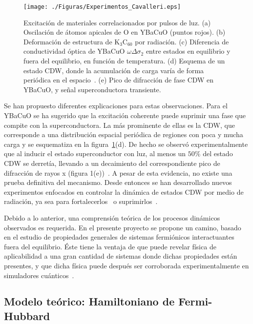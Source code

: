 \documentclass[a4paper,10pt]{article}
\begin{document}
\begin{figure}
\begin{center}
\texttt{[image: ./Figuras/Experimentos\_Cavalleri.eps]}
\caption{\label{exper_cavalleri} Excitaci\'on de materiales correlacionados por pulsos de luz. (a) Oscilaci\'on de \'atomos apicales de O en YBaCuO (puntos rojos). (b) Deformaci\'on de estructura de K$_3$C$_{60}$ por radiaci\'on. (c) Diferencia de conductividad \'optica de YBaCuO $\omega\Delta\sigma_2$ entre estados en equilibrio y fuera del equilibrio, en funci\'on de temperatura. (d) Esquema de un estado CDW, donde la acumulaci\'on de carga var\'ia de forma peri\'odica en el espacio~\cite{singer2016prl}. (e) Pico de difracci\'on de fase CDW en YBaCuO, y se\~nal superconductora transiente.}
\end{center}
\end{figure}

Se han propuesto diferentes explicaciones para estas observaciones. Para el YBaCuO se ha sugerido que la excitaci\'on coherente puede suprimir una fase que compite con la superconductora. La m\'as prominente de ellas es la CDW, que corresponde a una distribuci\'on espacial peri\'odica de regiones con poca y mucha carga y se esquematiza en la figura~\ref{exper_cavalleri}(d). De hecho se observ\'o experimentalmente que al inducir el estado superconductor con luz, al menos un $50\%$ del estado CDW se derret\'ia, llevando a un decaimiento del correspondiente pico de difracci\'on de rayos x (figura 1(e))~\cite{forst2014prb}. A pesar de esta evidencia, no existe una prueba definitiva del mecanismo. Desde entonces se han desarrollado nuevos experimentos enfocados en controlar la din\'amica de estados CDW por medio de radiaci\'on, ya sea para fortalecerlos~\cite{singer2016prl} o suprimirlos~\cite{mankowsky2017prl}. 

Debido a lo anterior, una comprensi\'on te\'orica de los procesos din\'amicos observados es requerida. En el presente proyecto se propone un camino, basado en el estudio de propiedades generales de sistemas fermi\'onicos interactuantes fuera del equilibrio. \'Este tiene la ventaja de que puede revelar f\'isica de aplicabilidad a una gran cantidad de sistemas donde dichas propiedades est\'an presentes, y que dicha f\'isica puede despu\'es ser corroborada experimentalmente en simuladores cu\'anticos~\cite{georgescu2014rmp}.

\subsection{Modelo te\'orico: Hamiltoniano de Fermi-Hubbard}
\end{document}
